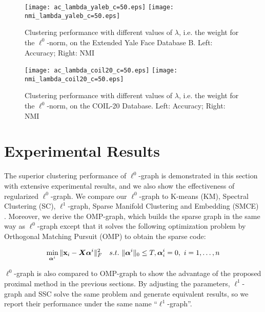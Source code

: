 \documentclass[10pt,twocolumn,letterpaper]{article}
\begin{document}
\begin{figure*}[!htb]
\begin{center}
\texttt{[image: ac\_lambda\_yaleb\_c=50.eps]}
\texttt{[image: nmi\_lambda\_yaleb\_c=50.eps]}
\end{center}
   \caption{Clustering performance with different values of $\lambda$, i.e. the weight for the $\ell^{0}$-norm, on the Extended Yale Face Database B. Left: Accuracy; Right: NMI}
\label{fig:yaleb-lambda}
\end{figure*}

\begin{figure*}[!htb]
\begin{center}
\texttt{[image: ac\_lambda\_coil20\_c=50.eps]}
\texttt{[image: nmi\_lambda\_coil20\_c=50.eps]}
\end{center}
   \caption{Clustering performance with different values of $\lambda$, i.e. the weight for the $\ell^{0}$-norm, on the COIL-20 Database. Left: Accuracy; Right: NMI}
\label{fig:coil20-lambda}
\end{figure*}


\section{Experimental Results}
The superior clustering performance of $\ell^{0}$-graph is demonstrated in this section with extensive experimental results, and we also show the effectiveness of regularized $\ell^{0}$-graph.  We compare our $\ell^{0}$-graph to K-means (KM), Spectral Clustering (SC), $\ell^{1}$-graph, Sparse Manifold Clustering and Embedding (SMCE) \cite{ElhamifarV11}. Moreover, we derive the OMP-graph, which builds the sparse graph in the same way as $\ell^{0}$-graph except that it solves the following optimization problem by Orthogonal Matching Pursuit (OMP) to obtain the sparse code:
\begin{small}\begin{align}\label{eq:ompgraph}
\mathop {\min }\limits_{{\bm{\alpha}^i}} \|\mathbf{x}_i - \bm X \bm{\alpha}^{i}\|_F^2  \quad s.t. \,\, \|{\bm{\alpha}^{i}}\|_0 \le T, {\bm{\alpha}}_i^i = 0, \,\, i=1,\ldots,n
\end{align}\end{small}
$\ell^{0}$-graph is also compared to OMP-graph to show the advantage of the proposed proximal method in the previous sections. By adjusting the parameters, $\ell^{1}$-graph and SSC solve the same problem and generate equivalent results, so we report their performance under the same name ``$\ell^{1}$-graph''.
\end{document}
